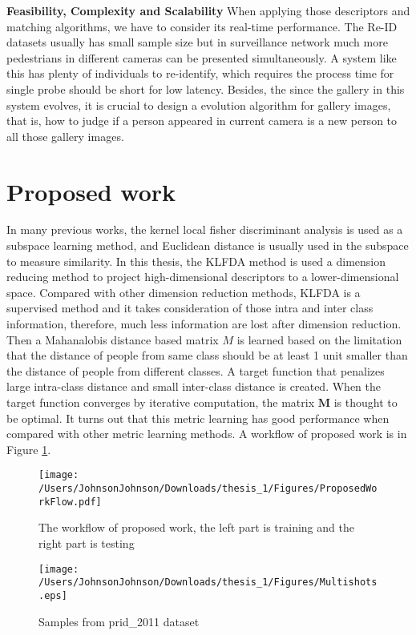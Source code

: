 \textbf{Feasibility, Complexity and Scalability} When applying those descriptors and matching algorithms, we have to consider its real-time performance. The Re-ID datasets usually has small sample size but in surveillance network much more pedestrians in different cameras can be presented simultaneously. A system like this has plenty of individuals to re-identify, which requires the process time for single probe should be short for low latency. Besides, the since the gallery in this system evolves, it is crucial to design a evolution algorithm for gallery images, that is, how to judge if a person appeared in current camera is a new person to all those gallery images.

\section{Proposed work}
In many previous works, the kernel local fisher discriminant analysis is used as a subspace learning method, and Euclidean distance is usually used in the subspace to measure similarity. In this thesis, the KLFDA \cite{KLFDA} method is used a dimension reducing method to project high-dimensional descriptors to a lower-dimensional space. Compared with other dimension reduction methods, KLFDA is a supervised method and it takes consideration of those intra and inter class information, therefore, much less information are lost after dimension reduction. Then a Mahanalobis distance based matrix $M$ is learned based on the limitation that the distance of people from same class should be at least 1 unit smaller than the distance of people from different classes. A target function that penalizes large intra-class distance and small inter-class distance is created. When the target function converges by iterative computation, the matrix $\bm{M}$ is thought to be optimal. It turns out that this metric learning has good performance when compared with other metric learning methods. A workflow of proposed work is in Figure \ref{ProposedWorkflow}.

\begin{figure}[H]

\texttt{[image: /Users/JohnsonJohnson/Downloads/thesis\_1/Figures/ProposedWorkFlow.pdf]}
\vspace{-2em}
\caption{The workflow of proposed work, the left part is training and the right part is testing}
\label{ProposedWorkflow}

\end{figure}
\begin{figure}[H]

\texttt{[image: /Users/JohnsonJohnson/Downloads/thesis\_1/Figures/Multishots.eps]}
\vspace{-2em}
\caption{Samples from prid\_2011 dataset}

\end{figure}


